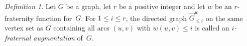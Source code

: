 \documentclass[1p,number,a4paper]{elsarticle}
\theoremstyle{remark}
\newtheorem{definition}[theorem]{Definition}
\begin{document}
%



\begin{definition}
Let $G$ be a graph, let $r$ be a positive integer and let 
$w$ be an $r$-fraternity function for~$G$. 
For $1\leq i\leq r$, the directed graph $\vec{G}^w_{\leq i}$
on the same vertex set as $G$ containing all arcs 
$(u,v)$ with $w(u,v)\leq i$  is called an 
\emph{$i$-fraternal augmentation} of~$G$. 
\end{definition}
\end{document}
